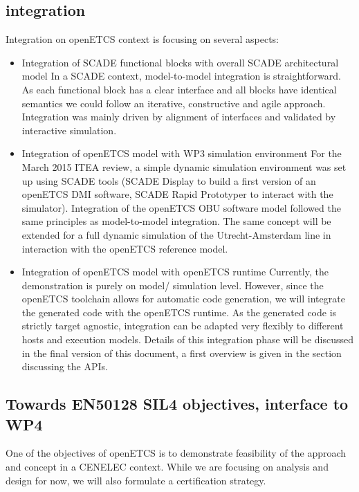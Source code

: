 \subsection{integration}
%
%
Integration on openETCS context is focusing on several aspects:
\begin{itemize}
%
\item Integration of SCADE functional blocks with overall SCADE architectural model
%
In a SCADE context, model-to-model integration is straightforward. As each functional block has a clear interface and all blocks have identical semantics we could follow an iterative, constructive and agile approach.
Integration was mainly driven by alignment of interfaces and validated by interactive simulation. 
%
%
\item Integration of openETCS model with WP3 simulation environment 
%
For the March 2015 ITEA review, a simple dynamic simulation environment was set up using SCADE tools (SCADE Display to build a first version of an openETCS DMI software, SCADE Rapid Prototyper to interact with the simulator).
Integration of the openETCS OBU software model followed the same principles as model-to-model integration.
The same concept will be extended for a full dynamic simulation of the Utrecht-Amsterdam line in interaction with the openETCS reference model.
%
%
\item Integration of openETCS model with openETCS runtime
%
Currently, the demonstration is purely on model/ simulation level. However, since the openETCS toolchain allows for automatic code generation, we will integrate the generated code with the openETCS runtime. 
As the generated code is strictly target agnostic, integration can be adapted very flexibly to different hosts and execution models.
Details of this integration phase will be discussed in the final version of this document, a first overview is given in the section discussing the APIs.
%
%
%
%
\end{itemize}

\subsection{Towards EN50128 SIL4 objectives, interface to WP4}

One of the objectives of openETCS is to demonstrate feasibility of the approach and concept in a CENELEC context.
While we are focusing on analysis and design for now, we will also formulate a certification strategy.


